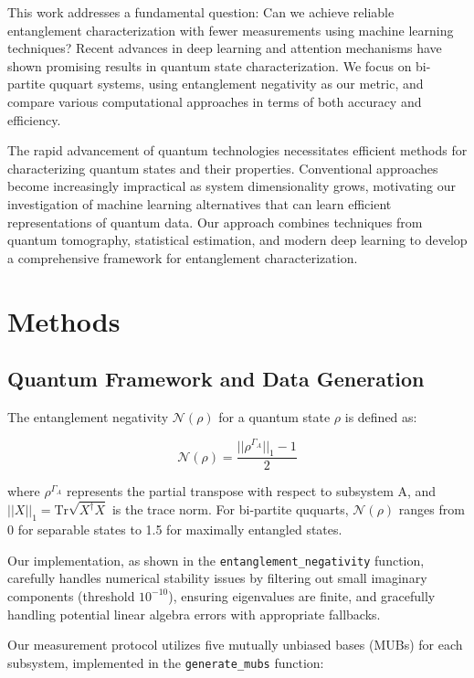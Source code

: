\documentclass{optica-article}
\begin{document}
This work addresses a fundamental question: Can we achieve reliable entanglement characterization with fewer measurements using machine learning techniques? Recent advances in deep learning\cite{LeCun2015} and attention mechanisms\cite{Vaswani2017} have shown promising results in quantum state characterization\cite{transformer_quantum_2022,doi:10.1126/sciadv.add7131}. We focus on bi-partite ququart systems, using entanglement negativity as our metric, and compare various computational approaches in terms of both accuracy and efficiency.

The rapid advancement of quantum technologies necessitates efficient methods for characterizing quantum states and their properties. Conventional approaches become increasingly impractical as system dimensionality grows, motivating our investigation of machine learning alternatives that can learn efficient representations of quantum data. Our approach combines techniques from quantum tomography, statistical estimation, and modern deep learning to develop a comprehensive framework for entanglement characterization.

\section{Methods}

\subsection{Quantum Framework and Data Generation}

The entanglement negativity $\mathcal{N}(\rho)$ for a quantum state $\rho$ is defined as:

$$ \mathcal{N}(\rho) = \frac{||\rho^{\Gamma_A}||_1 - 1}{2} $$

where $\rho^{\Gamma_A}$ represents the partial transpose with respect to subsystem A, and $||X||_1 = \text{Tr}\sqrt{X^\dagger X}$ is the trace norm. For bi-partite ququarts, $\mathcal{N}(\rho)$ ranges from 0 for separable states to 1.5 for maximally entangled states.

Our implementation, as shown in the \texttt{entanglement\_negativity} function, carefully handles numerical stability issues by filtering out small imaginary components (threshold $10^{-10}$), ensuring eigenvalues are finite, and gracefully handling potential linear algebra errors with appropriate fallbacks.

Our measurement protocol utilizes five mutually unbiased bases (MUBs) for each subsystem, implemented in the \texttt{generate\_mubs} function:
\end{document}
